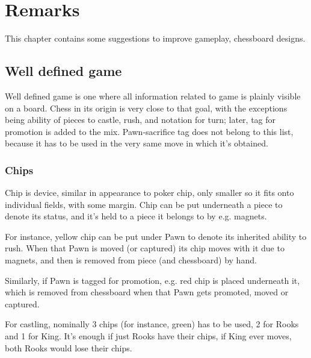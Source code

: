 

\chapter*{Remarks}
\label{ch:Remarks}

This chapter contains some suggestions to improve gameplay, chessboard
designs.

\section*{Well defined game}
\label{sec:Remarks/Well defined game}

Well defined game is one where all information related to game is plainly
visible on a board. Chess in its origin is very close to that goal, with
the exceptions being ability of pieces to castle, rush, and notation for
turn; later, tag for promotion is added to the mix. Pawn-sacrifice tag
does not belong to this list, because it has to be used in the very same
move in which it's obtained.

\subsection*{Chips}
\label{sec:Remarks/Chips}

Chip is device, similar in appearance to poker chip, only smaller so it fits
onto individual fields, with some margin. Chip can be put underneath a piece
to denote its status, and it's held to a piece it belongs to by e.g. magnets.

For instance, yellow chip can be put under Pawn to denote its inherited ability
to rush. When that Pawn is moved (or captured) its chip moves with it due to
magnets, and then is removed from piece (and chessboard) by hand.

Similarly, if Pawn is tagged for promotion, e.g. red chip is placed underneath
it, which is removed from chessboard when that Pawn gets promoted, moved or
captured.

For castling, nominally 3 chips (for instance, green) has to be used, 2 for
Rooks and 1 for King. It's enough if just Rooks have their chips, if King ever
moves, both Rooks would lose their chips.

